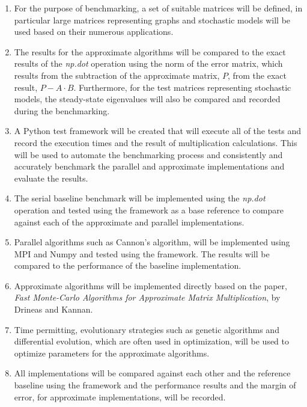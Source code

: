 \documentclass[oneside]{article}
\begin{document}
\begin{enumerate}
\item For the purpose of benchmarking, a set of suitable matrices will be defined, in particular large matrices representing graphs and stochastic models will be used based on their numerous applications\cite{yegnanarayanan2013application}.

\item The results for the approximate algorithms will be compared to the exact results of the \emph{np.dot} operation using the norm of the error matrix, which results from the subtraction of the approximate matrix, $P$, from the exact result, $P - A \cdot B$\cite{drineas2001fast}. Furthermore, for the test matrices representing stochastic models, the steady-state eigenvalues will also be compared and recorded during the benchmarking.

\item A Python test framework will be created that will execute all of the tests and record the execution times and the result of multiplication calculations. This will be used to automate the benchmarking process and consistently and accurately benchmark the parallel and approximate implementations and evaluate the results.

\item The serial baseline benchmark will be implemented using the \emph{np.dot} operation and tested using the framework as a base reference to compare against each of the approximate and parallel implementations.

\item Parallel algorithms such as Cannon's algorithm\cite{lee1997generalized}, will be implemented using MPI and Numpy and tested using the framework. The results will be compared to the performance of the baseline implementation.

\item Approximate algorithms will be implemented directly based on the paper, \emph{Fast Monte-Carlo Algorithms for Approximate Matrix Multiplication}\cite{drineas2001fast}, by Drineas and Kannan.

\item Time permitting, evolutionary strategies such as genetic algorithms and differential evolution, which are often used in optimization\cite{de1989using}, will be used to optimize parameters for the approximate algorithms.

\item All implementations will be compared against each other and the reference baseline using the framework and the performance results and the margin of error, for approximate implementations, will be recorded.
\end{enumerate}
\end{document}
